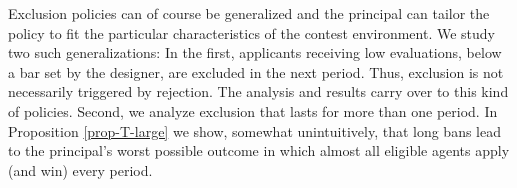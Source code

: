 \documentclass[12pt]{article}
\theoremstyle{plain}
\theoremstyle{definition}
\theoremstyle{remark}
\begin{document}



Exclusion policies can of course be generalized and the principal can tailor the policy to fit the particular characteristics of the contest environment. We study two such generalizations: In the first, applicants receiving low evaluations, below a bar set by the designer, are excluded in the next period. Thus, exclusion is not necessarily triggered by rejection. The analysis and results carry over to this kind of policies. Second, we analyze exclusion that lasts for more than one period. In Proposition \ref{prop-T-large} we show, somewhat unintuitively, that long bans lead to the principal's worst possible outcome in which almost all eligible agents apply (and win) every period.

\end{document}
